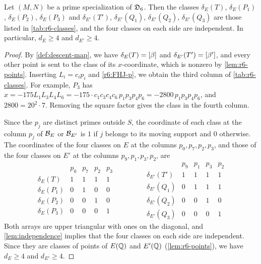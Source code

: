 \begin{lemma}\label{lem:r6-classes}
Let $(M,N)$ be a prime specialization of $\mathfrak D_6$. Then the classes $\delta_E(T)$, $\delta_E(P_1)$, $\delta_E(P_2)$, $\delta_E(P_3)$ and $\delta_{E'}(T')$, $\delta_{E'}(Q_1)$, $\delta_{E'}(Q_2)$, $\delta_{E'}(Q_3)$ are those listed in \cref{tab:r6-classes}, and the four classes on each side are independent. In particular, $d_E\ge4$ and $d_{E'}\ge4$.
\end{lemma}

\begin{proof}
By \cref{def:descent-map}, we have $\delta_E(T)=[\beta]$ and $\delta_{E'}(T')=[\beta']$, and every other point is sent to the class of its $x$-coordinate, which is nonzero by \cref{lem:r6-points}. Inserting $L_i=c_ip_i$ and \eqref{r6:FHJ-p}, we obtain the third column of \cref{tab:r6-classes}. For example, $P_3$ has $x=-175L_1L_3L_4L_6=-175\cdot c_1c_3c_4c_6\,p_1p_3p_4p_6=-2800\,p_1p_3p_4p_6$, and $2800=20^2\cdot7$. Removing the square factor gives the class in the fourth column.

Since the $p_j$ are distinct primes outside $S$, the coordinate of each class at the column $p_j$ of $\mathcal B_E$ or $\mathcal B_{E'}$ is $1$ if $j$ belongs to its moving support and $0$ otherwise. The coordinates of the four classes on $E$ at the columns $p_0,p_7,p_2,p_3$, and those of the four classes on $E'$ at the columns $p_9,p_1,p_3,p_2$, are
\[
\begin{array}{c|cccc}
 & p_0 & p_7 & p_2 & p_3\\
\hline
\delta_E(T) & 1 & 1 & 1 & 1\\
\delta_E(P_1) & 0 & 1 & 0 & 0\\
\delta_E(P_2) & 0 & 0 & 1 & 0\\
\delta_E(P_3) & 0 & 0 & 0 & 1
\end{array}
\qquad\qquad
\begin{array}{c|cccc}
 & p_9 & p_1 & p_3 & p_2\\
\hline
\delta_{E'}(T') & 1 & 1 & 1 & 1\\
\delta_{E'}(Q_1) & 0 & 1 & 1 & 1\\
\delta_{E'}(Q_2) & 0 & 0 & 1 & 0\\
\delta_{E'}(Q_3) & 0 & 0 & 0 & 1
\end{array}
\]
Both arrays are upper triangular with ones on the diagonal, and \cref{lem:independence} implies that the four classes on each side are independent. Since they are classes of points of $E(\mathbb Q)$ and $E'(\mathbb Q)$ (\cref{lem:r6-points}), we have $d_E\ge4$ and $d_{E'}\ge4$.
\end{proof}

